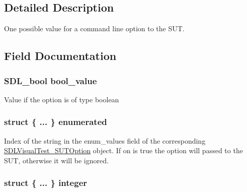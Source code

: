 \subsection{Detailed Description}
One possible value for a command line option to the S\-U\-T. 

\subsection{Field Documentation}
\hypertarget{union_s_d_l_visual_test___s_u_t_option_value_ace8ec6519c056e35443a6c401f3d0941}{
\subsubsection[{bool\-\_\-value}]{\setlength{\rightskip}{0pt plus 5cm}S\-D\-L\-\_\-bool bool\-\_\-value}}\label{union_s_d_l_visual_test___s_u_t_option_value_ace8ec6519c056e35443a6c401f3d0941}
Value if the option is of type boolean \hypertarget{union_s_d_l_visual_test___s_u_t_option_value_ad40e26afd4b8532327b61897d5b009e3}{
\subsubsection[{enumerated}]{\setlength{\rightskip}{0pt plus 5cm}struct \{ ... \}   enumerated}}\label{union_s_d_l_visual_test___s_u_t_option_value_ad40e26afd4b8532327b61897d5b009e3}
Index of the string in the enum\-\_\-values field of the corresponding \hyperlink{struct_s_d_l_visual_test___s_u_t_option}{S\-D\-L\-Visual\-Test\-\_\-\-S\-U\-T\-Option} object. If on is true the option will passed to the S\-U\-T, otherwise it will be ignored. \hypertarget{union_s_d_l_visual_test___s_u_t_option_value_a4291d9ad3cfb3fe1645ea2732e11d68a}{
\subsubsection[{integer}]{\setlength{\rightskip}{0pt plus 5cm}struct \{ ... \}   integer}}\label{union_s_d_l_visual_test___s_u_t_option_value_a4291d9ad3cfb3fe1645ea2732e11d68a}
